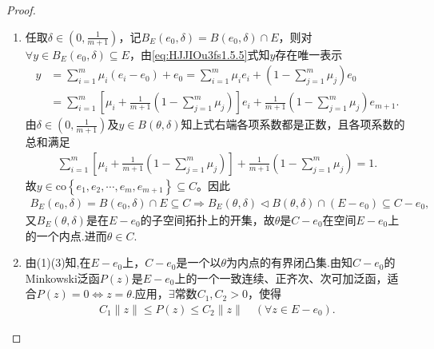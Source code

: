 \documentclass[../../main.tex]{subfiles}%
\begin{document}
\begin{proof}
\begin{enumerate}[(1)]
\item 任取$\delta \in \left( 0,\frac{1}{m+1} \right)$，记$B_E\left( e_0,\delta \right) =B\left( e_0,\delta \right) \cap E$，则对$\forall y\in B_E\left( e_0,\delta \right) \subseteq E$，由\eqref{eq:HJJIOu3fs1.5.5}式知$y$存在唯一表示\begin{align*}
y&=\sum\limits_{i=1}^m \mu_i (e_i-e_0)+e_0=\sum\limits_{i=1}^m \mu_i e_i+\left( 1-\sum\limits_{j=1}^m \mu_j \right) e_0\\
&=\sum\limits_{i=1}^m \left[ \mu_i+\frac{1}{m+1}\left( 1-\sum\limits_{j=1}^m \mu_j \right) \right] e_i+\frac{1}{m+1}\left( 1-\sum\limits_{j=1}^m \mu_j \right) e_{m+1}.
\end{align*}
由$\delta \in \left( 0,\frac{1}{m+1} \right)$及$y\in B\left( \theta ,\delta \right)$知上式右端各项系数都是正数，且各项系数的总和满足\begin{align*}
\sum\limits_{i=1}^m \left[ \mu_i+\frac{1}{m+1}\left( 1-\sum\limits_{j=1}^m \mu_j \right) \right]+\frac{1}{m+1}\left( 1-\sum\limits_{j=1}^m \mu_j \right) =1.
\end{align*}
故$y\in \mathrm{co}\left\{ e_1,e_2,\cdots ,e_m,e_{m+1} \right\} \subseteq C$。因此\begin{align*}
B_E\left( e_0,\delta \right) =B\left( e_0,\delta \right) \cap E\subseteq C\Longrightarrow B_E\left( \theta ,\delta \right) \lhd B\left( \theta ,\delta \right) \cap \left( E-e_0 \right) \subseteq C-e_0,
\end{align*}
又$B_E\left( \theta ,\delta \right)$是在$E-e_0$的子空间拓扑上的开集，故$\theta$是$C-e_0$在空间$E-e_0$上的一个内点.进而$\theta \in C$.

\item 由(1)(3)知,在$E - e_0$上，$C - e_0$是一个以$\theta$为内点的有界闭凸集.由知$C-e_0$的Minkowski泛函$P(z)$是$E - e_0$上的一个一致连续、正齐次、次可加泛函，适合$P(z) = 0 \iff z = \theta$.应用，$\exists$常数$C_1, C_2 > 0$，使得
\begin{align}\label{eq:::2isejroIORU}
C_1 \|z\| \leqslant P(z) \leqslant C_2 \|z\| \quad (\forall z \in E - e_0).
\end{align}


\end{enumerate}
\end{proof}
\end{document}
